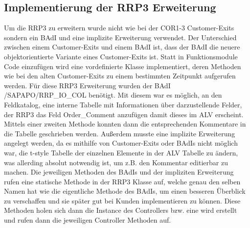 \subsection{Implementierung der RRP3 Erweiterung}
\label{sec:Implementierung der RRP3 Erweiterung}   
Um die RRP3 zu erweitern wurde nicht wie bei der COR1-3 Customer-Exits sondern ein \ac{BAdI} und eine implizite Erweiterung verwendet. Der Unterschied zwischen einem Customer-Exits und einem \ac{BAdI} ist, dass der \ac{BAdI} die neuere objektorientierte Variante eines Customer-Exits ist. Statt in Funktionsmodule Code einzufügen wird eine vordefinierte Klasse implementiert, deren Methoden wie bei den alten Customer-Exits zu einem bestimmten Zeitpunkt aufgerufen werden. Für diese RRP3 Erweiterung wurden der \ac{BAdI} \textsc{/SAPAPO/RRP\_IO\_COL} benötigt. Mit diesem war es möglich, an den Feldkatalog, eine interne Tabelle mit Informationen über darzustellende Felder, der RRP3 das Feld Order\_Comment anzufügen damit dieses im \ac{ALV} erscheint. Mittels einer zweiten Methode konnten dann die entsprechenden Kommentare in die Tabelle geschrieben werden. Außerdem musste eine implizite Erweiterung angelegt werden, da es mithilfe von Customer-Exits oder \ac{BAdI}s nicht möglich war, die t-style Tabelle der einzelnen Elemente in der \ac{ALV} Tabelle zu ändern, was allerding absolut notwendig ist, um z.B. den Kommentar editierbar zu machen. Die jeweiligen Methoden des \ac{BAdI}s und der impliziten Erweiterung rufen eine statische Methode in der RRP3 Klasse auf, welche genau den selben Namen hat wie die eigentliche Methode des \ac{BAdI}s, um einen besseren Überblick zu verschaffen und sie später gut bei Kunden implementieren zu können. Diese Methoden holen sich dann die Instance des Controllers bzw. eine wird erstellt und rufen dann die jeweiligen Controller Methoden auf.

